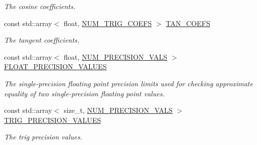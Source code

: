 \begin{DoxyCompactItemize}
\begin{DoxyCompactList}\small\item\em The cosine coefficients. \end{DoxyCompactList}\item 
\hypertarget{group___scalar_math_consts_ga90b12065e5a4a254047642c470a914e2}{}const std\+::array$<$ float, \hyperlink{group___scalar_math_consts_ga090f5a34fbed01148a6f72dc1abb00e9}{N\+U\+M\+\_\+\+T\+R\+I\+G\+\_\+\+C\+O\+E\+F\+S} $>$ \hyperlink{group___scalar_math_consts_ga90b12065e5a4a254047642c470a914e2}{T\+A\+N\+\_\+\+C\+O\+E\+F\+S}\label{group___scalar_math_consts_ga90b12065e5a4a254047642c470a914e2}

\begin{DoxyCompactList}\small\item\em The tangent coefficients. \end{DoxyCompactList}\item 
const std\+::array$<$ float, \hyperlink{group___scalar_math_consts_ga2b78b41d32d14485b997dada705037bb}{N\+U\+M\+\_\+\+P\+R\+E\+C\+I\+S\+I\+O\+N\+\_\+\+V\+A\+L\+S} $>$ \hyperlink{group___scalar_math_consts_gaf4aa0e398360c38bcc73d49870dde85f}{F\+L\+O\+A\+T\+\_\+\+P\+R\+E\+C\+I\+S\+I\+O\+N\+\_\+\+V\+A\+L\+U\+E\+S}
\begin{DoxyCompactList}\small\item\em The single-\/precision floating point precision limits used for checking approximate equality of two single-\/precision floating point values. \end{DoxyCompactList}\item 
\hypertarget{group___scalar_math_consts_ga09446c202c72b49275691023496fc480}{}const std\+::array$<$ size\+\_\+t, \hyperlink{group___scalar_math_consts_ga2b78b41d32d14485b997dada705037bb}{N\+U\+M\+\_\+\+P\+R\+E\+C\+I\+S\+I\+O\+N\+\_\+\+V\+A\+L\+S} $>$ \hyperlink{group___scalar_math_consts_ga09446c202c72b49275691023496fc480}{T\+R\+I\+G\+\_\+\+P\+R\+E\+C\+I\+S\+I\+O\+N\+\_\+\+V\+A\+L\+U\+E\+S}\label{group___scalar_math_consts_ga09446c202c72b49275691023496fc480}

\begin{DoxyCompactList}\small\item\em The trig precision values. \end{DoxyCompactList}\end{DoxyCompactItemize}
